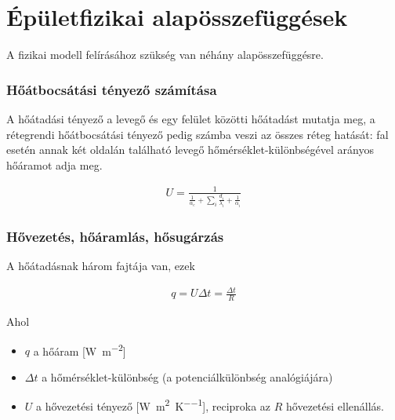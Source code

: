  


\section{Épületfizikai alapösszefüggések}
 
 A fizikai modell felírásához szükség van néhány alapösszefüggésre.
 
 \subsubsection*{Hőátbocsátási tényező számítása}
 A hőátadási tényező a levegő és egy felület közötti hőátadást mutatja meg,
 a rétegrendi hőátbocsátási tényező pedig számba veszi az összes réteg hatását: fal esetén annak két oldalán található levegő hőmérséklet-különbségével arányos hőáramot adja meg. 
 
 \begin{equation}\label{eq_hoatbcsatas_U}
 \begin{aligned}
 U = \frac{1}{\frac{1}{\alpha_e}+\sum\limits_{i}^{}\frac{d_i}{\lambda_i}+\frac{1}{\alpha_i}}
 \end{aligned}
 \end{equation}
 
\subsubsection*{Hővezetés, hőáramlás, hősugárzás}

A hőátadásnak három fajtája van, ezek 

\begin{equation} \label{eq_hoaram_alap}
\begin{aligned}
q = U\Delta t = \frac{\Delta t}{R}
\end{aligned}
\end{equation}

Ahol 

\begin{itemize}[itemsep=6pt,topsep=0pt,parsep=0pt,partopsep=0pt]
	\item[] $q$ a hőáram [\si[per-mode=fraction]{\watt\per\metre\squared}]
	\item[] $\Delta t$ a hőmérséklet-különbség (a potenciálkülönbség analógiájára)
	\item[] $U$ a hővezetési tényező [\si[per-mode=fraction]{\watt\per\metre\squared\per\kelvin}], reciproka az $R$ hővezetési ellenállás.
\end{itemize}


